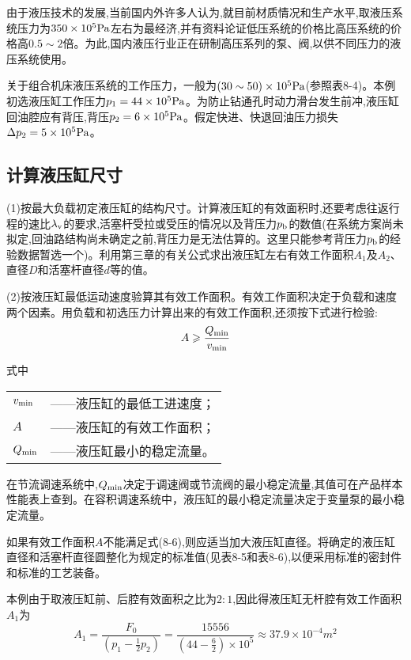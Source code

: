 由于液压技术的发展,当前国内外许多人认为,就目前材质情况和生产水平,取液压系统压力为$350\times 10^5{\rm Pa}$左右为最经济,并有资料论证低压系统的价格比高压系统的价格高$0.5\sim 2$倍。为此,国内液压行业正在研制高压系列的泵、阀,以供不同压力的液压系统使用。

关于组合机床液压系统的工作压力，一般为$(30\sim 50)\times 10^5{\rm Pa}$(参照表8-4)。本例初选液压缸工作压力$p_{1}=44\times 10^5{\rm Pa}$。为防止钻通孔时动力滑台发生前冲,液压缸回油腔应有背压,背压$p_{2}=6\times 10^5{\rm Pa}$。假定快进、快退回油压力损失$\Delta p_{2}=5\times 10^5{\rm Pa}$。

\subsection{计算液压缸尺寸}
(1)按最大负载初定液压缸的结构尺寸。计算液压缸的有效面积时,还要考虑往返行程的速比$\lambda_{\rm v}$的要求,活塞杆受拉或受压的情况以及背压力$p_{\rm b}$的数值(在系统方案尚未拟定,回油路结构尚未确定之前,背压力是无法估算的。这里只能参考背压力$p_{\rm b}$的经验数据暂选一个)。利用第三章的有关公式求出液压缸左右有效工作面积$A_{1}$及$A_{2}$、直径$D$和活塞杆直径$d$等的值。

(2)按液压缸最低运动速度验算其有效工作面积。有效工作面积决定于负载和速度两个因素。用负载和初选压力计算出来的有效工作面积,还须按下式进行检验:
\begin{equation}
A\geqslant \frac{Q_{\rm min}}{v_{\rm min}}
\end{equation}

\noindent 式中\quad
\begin{tabular}[t]{ll}
$v_{\rm min}$ &——液压缸的最低工进速度；\\
$A$ &——液压缸的有效工作面积；\\
$Q_{\rm min}$ &——液压缸最小的稳定流量。
\end{tabular}

在节流调速系统中,$Q_{\rm min}$决定于调速阀或节流阀的最小稳定流量,其值可在产品样本性能表上查到。在容积调速系统中，液压缸的最小稳定流量决定于变量泵的最小稳定流量。

如果有效工作面积$A$不能满足式(8-6),则应适当加大液压缸直径。将确定的液压缸直径和活塞杆直径圆整化为规定的标准值(见表8-5和表8-6),以便采用标准的密封件和标准的工艺装备。

本例由于取液压缸前、后腔有效面积之比为$2:1$,因此得液压缸无杆腔有效工作面积$A_{1}$为
\begin{equation*}
A_{1}=\frac{F_0}{(p_1-\frac{1}{2}p_2)}=\frac{15556}{(44-\frac{6}{2})\times 10^5}\approx 37.9 \times 10^{-4}m^2
\end{equation*}

